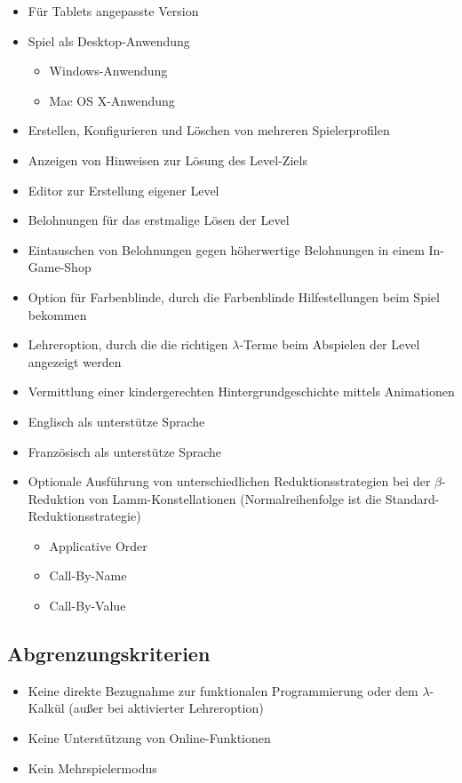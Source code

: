 \begin{itemize}
	\item Für Tablets angepasste Version
	\item Spiel als Desktop-Anwendung
	\begin{itemize}
		\item Windows-Anwendung
		\item Mac OS X-Anwendung
	\end{itemize}
	\item Erstellen, Konfigurieren und Löschen von mehreren Spielerprofilen
	\item Anzeigen von Hinweisen zur Lösung des Level-Ziels
	\item Editor zur Erstellung eigener Level
	\item Belohnungen für das erstmalige Lösen der Level
	\item Eintauschen von Belohnungen gegen höherwertige Belohnungen in einem In-Game-Shop
	\item Option für Farbenblinde, durch die Farbenblinde Hilfestellungen beim Spiel bekommen
	\item Lehreroption, durch die die richtigen $\lambda$-Terme beim Abspielen der Level angezeigt werden
	\item Vermittlung einer kindergerechten Hintergrundgeschichte mittels Animationen
	\item Englisch als unterstütze Sprache
	\item Französisch als unterstütze Sprache
	\item Optionale Ausführung von unterschiedlichen Reduktionsstrategien bei der $\beta$-Reduktion von Lamm-Konstellationen (Normalreihenfolge ist die Standard-Reduktionsstrategie)
	\begin{itemize}
		\item Applicative Order
		\item Call-By-Name
		\item Call-By-Value
	\end{itemize}
		
\end{itemize}

\subsection{Abgrenzungskriterien}

\begin{itemize}
	\item Keine direkte Bezugnahme zur funktionalen Programmierung oder dem $\lambda$-Kalkül (außer bei aktivierter Lehreroption) 
	\item Keine Unterstützung von Online-Funktionen
	\item Kein Mehrspielermodus
\end{itemize}

